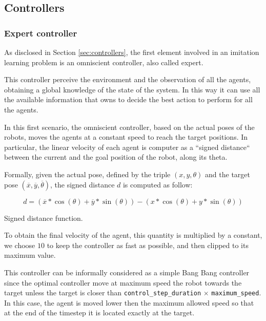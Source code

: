 \subsection{Controllers}
\label{subsec:controllers}

\subsubsection{Expert controller}
\label{subsubsec:omniscient}

As disclosed in Section \ref{sec:controllers}, the first element involved in an 
imitation learning problem is an omniscient controller, also called expert.

This controller perceive the environment and the observation of all the agents, 
obtaining a global knowledge of the state of the system. In this way it can use all 
the available information that owns to decide the best action to perform for all 
the agents. 

In this first scenario, the omniscient controller, based on the actual poses of the 
robots, moves the agents at a constant speed to reach the target positions. In 
particular, the linear velocity of each agent is computer as a ``signed distance`` 
between the current and the goal position of the robot, along its theta. 

Formally, given the actual pose, defined by the triple $(x, y, \theta)$ and the 
target pose $(\overline x, \overline y, \overline \theta)$, the signed distance $d$ 
is computed as follow:

\begin{Equation}[!htb]
	\centering
	\begin{equation}
	d = \left(\overline x * \cos (\theta) + \overline y * \sin (\theta)\right) -
	\left( x * \cos (\theta) + y * \sin (\theta)\right)
	\end{equation}
	\caption[Signed distance.]{Signed distance function.}
	\label{eq:signeddist}
\end{Equation}

To obtain the final velocity of the agent, this quantity is multiplied by a constant, 
we choose $10$ to keep the controller as fast as possible, and then clipped to its 
maximum value.

This controller can be informally considered as a simple Bang Bang controller 
since the optimal controller move at maximum speed the robot towards the target 
unless the target is closer than %
\texttt{control\_step\_duration} $\times$ \texttt{maximum\_speed}. In this case, 
the agent is moved lower then the maximum allowed speed so that at the end of 
the timestep it is located exactly at the target.

